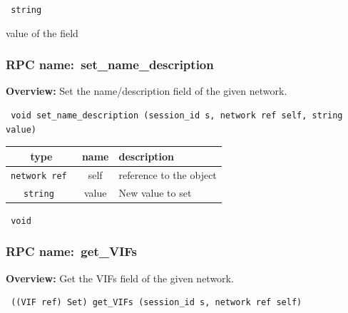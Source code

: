 \vspace{0.3cm}

{\tt 
string
}


value of the field
\vspace{0.3cm}
\vspace{0.3cm}
\vspace{0.3cm}
\subsubsection{RPC name:~set\_name\_description}

{\bf Overview:} 
Set the name/description field of the given network.

\begin{verbatim} void set_name_description (session_id s, network ref self, string value)\end{verbatim}



 
\vspace{0.3cm}
\begin{tabular}{|c|c|p{7cm}|}
 \hline
{\bf type} & {\bf name} & {\bf description} \\ \hline
{\tt network ref } & self & reference to the object \\ \hline 

{\tt string } & value & New value to set \\ \hline 

\end{tabular}

\vspace{0.3cm}

{\tt 
void
}



\vspace{0.3cm}
\vspace{0.3cm}
\vspace{0.3cm}
\subsubsection{RPC name:~get\_VIFs}

{\bf Overview:} 
Get the VIFs field of the given network.

\begin{verbatim} ((VIF ref) Set) get_VIFs (session_id s, network ref self)\end{verbatim}


